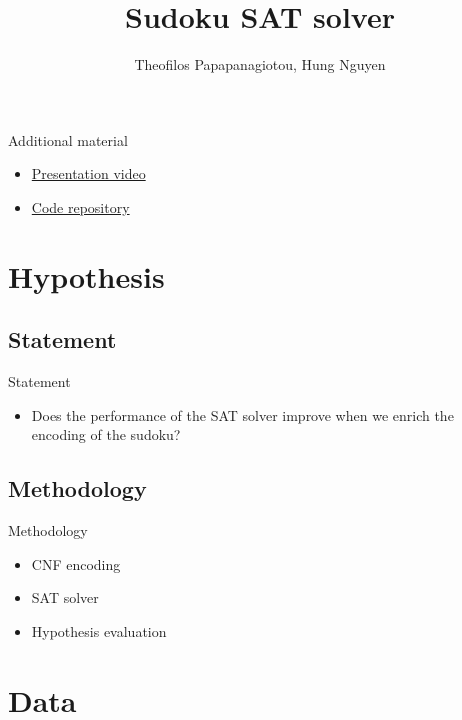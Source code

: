 \documentclass[11pt]{beamer}
\author{Theofilos Papapanagiotou, Hung Nguyen}
\title{Sudoku SAT solver}
\institute{UvA/VU}
\begin{document}
\begin{frame}
\titlepage
\end{frame}

\begin{frame}
\begin{multicols}{2}
\tableofcontents
\end{multicols}
\end{frame}

\begin{frame}{Additional material}
\begin{itemize}
\item \href{https://youtu.be/tk7kIJBqUiQ}{Presentation video}
\item \href{https://github.com/hungnguyen94/KR-SAT}{Code repository}
\end{itemize}
\end{frame}

\section{Hypothesis}

\subsection{Statement}

\begin{frame}{Statement}
\begin{itemize}
\item Does the performance of the SAT solver improve when we enrich the encoding of the sudoku?
\end{itemize}
\end{frame}

\subsection{Methodology}
\begin{frame}{Methodology}
\begin{itemize}
\item CNF encoding
\item SAT solver
\item Hypothesis evaluation
\end{itemize}
\end{frame}

\section{Data}
\end{document}
